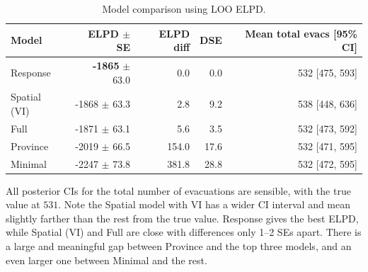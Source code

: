 \begin{table}[h!]
\centering
\caption{Model comparison using LOO ELPD.}
\label{tab:model_comparison_loo}
\begin{tabular}{lrrrr}
\hline
Model & ELPD $\pm$ SE & ELPD diff & DSE & Mean total evacs [95\% CI]  \\
\hline
Response & \textbf{-1865} $\pm$ 63.0 & 0.0 & 0.0 & 532 [475, 593] \\
Spatial (VI) & -1868 $\pm$ 63.3 & 2.8 & 9.2 & 538 [448, 636] \\
Full & -1871 $\pm$ 63.1 & 5.6 & 3.5 & 532 [473, 592] \\
Province & -2019 $\pm$ 66.5 & 154.0 & 17.6 & 532 [471, 595] \\
Minimal & -2247 $\pm$ 73.8 & 381.8 & 28.8 & 532 [472, 595] \\
\hline
\end{tabular}
\end{table}

All posterior CIs for the total number of evacuations are sensible, with the true value at $531$. Note the Spatial model with VI has a wider CI interval and mean slightly farther than the rest from the true value. Response gives the best ELPD, while Spatial (VI) and Full are close with differences only 1–2 SEs apart. There is a large and meaningful gap between Province and the top three models, and an even larger one between Minimal and the rest.

